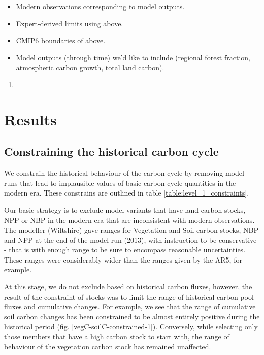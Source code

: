 \documentclass[gmd, manuscript]{copernicus}
\begin{document}
\begin{itemize}
    \item Modern observations corresponding to model outputs.
    \item Expert-derived limits using above.
    \item CMIP6 boundaries of above.
    \item Model outputs (through time) we'd like to include (regional forest fraction, atmospheric carbon growth, total land carbon).
\end{itemize}

\begin{enumerate}
    \item 
\end{enumerate}



\section{Results}

\subsection{Constraining the historical carbon cycle}

We constrain the historical behaviour of the carbon cycle by removing model runs that lead to implausible values of basic carbon cycle quantities in the modern era. These constrains are outlined in table \ref{table:level_1_constraints}.

Our basic strategy is to exclude model variants that have land carbon stocks, NPP or NBP in the modern era that are inconsistent with modern observations. The modeller (Wiltshire) gave ranges for Vegetation and Soil carbon stocks, NBP and NPP at the end of the model run (2013), with instruction to be conservative - that is with enough range to be sure to encompass reasonable uncertainties. These ranges were considerably wider than the ranges given by the AR5, for example.

At this stage, we do not exclude based on historical carbon fluxes, however, the result of  the constraint of stocks was to limit the range of historical carbon pool fluxes and cumulative changes. For example, we see that the range of cumulative soil carbon changes has been constrained to be almost entirely positive during the historical period (fig. \ref{vegC-soilC-constrained-1}). Conversely, while selecting only those members that have a high carbon stock to start with, the range of behaviour of the vegetation carbon stock has remained unaffected.
\end{document}
